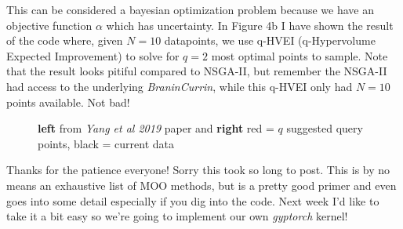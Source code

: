 \documentclass[12pt]{article}
\begin{document}
\vspace{5mm}

This can be considered a bayesian optimization problem because we have an objective function $\alpha$ which has uncertainty. In Figure 4b I have shown the result of the code where, given $N=10$ datapoints, we use q-HVEI (q-Hypervolume Expected Improvement) to solve for $q=2$ most optimal points to sample. Note that the result looks pitiful compared to NSGA-II, but remember the NSGA-II had access to the underlying \emph{BraninCurrin}, while this q-HVEI only had $N=10$ points available. Not bad!

\begin{figure}[h]
\centering
{}
\caption{\textbf{left} from \emph{Yang et al 2019} paper and \textbf{right} red = $q$ suggested query points, black = current data}
\end{figure}

\vspace{5mm}

Thanks for the patience everyone! Sorry this took so long to post. This is by no means an exhaustive list of MOO methods, but is a pretty good primer and even goes into some detail especially if you dig into the code. Next week I'd like to take it a bit easy so we're going to implement our own \emph{gyptorch} kernel!
\end{document}
